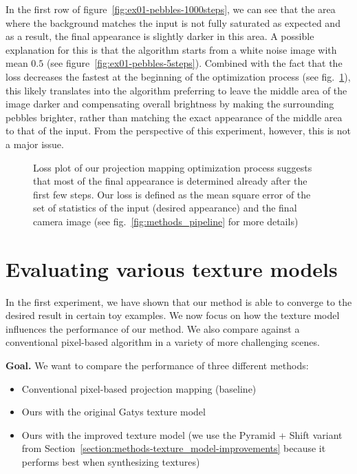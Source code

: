 In the first row of figure~\ref{fig:ex01-pebbles-1000steps}, we can see that the area where the background matches the input is not fully saturated as expected and as a result, the final appearance is slightly darker in this area. A possible explanation for this is that the algorithm starts from a white noise image with mean \(0.5\) (see figure~\ref{fig:ex01-pebbles-5steps}). Combined with the fact that the loss decreases the fastest at the beginning of the optimization process (see fig.~\ref{fig:ex01-loss_plot}), this likely translates into the algorithm preferring to leave the middle area of the image darker and compensating overall brightness by making the surrounding pebbles brighter, rather than matching the exact appearance of the middle area to that of the input. From the perspective of this experiment, however, this is not a major issue.

\begin{figure}[ht]
    \centering
    \def\svgwidth{0.8\textwidth}
    
    \caption{Loss plot of our projection mapping optimization process suggests that most of the final appearance is determined already after the first few steps. Our loss is defined as the mean square error of the set of statistics of the input (desired appearance) and the final camera image (see fig.~\ref{fig:methods_pipeline} for more details)}
    \label{fig:ex01-loss_plot}
\end{figure}

\section{Evaluating various texture models}
\label{section:results-experiments-02}

In the first experiment, we have shown that our method is able to converge to the desired result in certain toy examples. We now focus on how the texture model influences the performance of our method. We also compare against a conventional pixel-based algorithm in a variety of more challenging scenes.

\textbf{Goal.} We want to compare the performance of three different methods:

\begin{itemize}
    \item Conventional pixel-based projection mapping (baseline)
    \item Ours with the original Gatys texture model
    \item Ours with the improved texture model (we use the Pyramid + Shift variant from Section~\ref{section:methods-texture_model-improvements} because it performs best when synthesizing textures)
\end{itemize}

